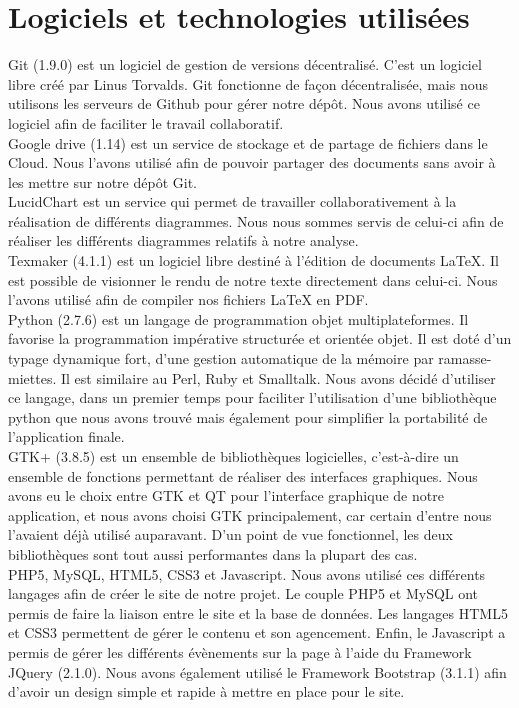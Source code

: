 ﻿\documentclass[16pts]{report}
\begin{document}
\section{Logiciels et technologies utilisées}
\label{sec:Logiciels et technologies utilisés}

Git (1.9.0) est un logiciel de gestion de versions décentralisé.
C'est un logiciel libre créé par Linus Torvalds.
Git fonctionne de façon décentralisée, mais nous utilisons les serveurs de 
Github pour gérer notre dépôt.
Nous avons utilisé ce logiciel afin de faciliter le travail collaboratif.
\\
Google drive (1.14) est un service de stockage et de partage de fichiers 
dans le Cloud. Nous l'avons utilisé afin de pouvoir partager des documents 
sans avoir à les mettre sur notre dépôt Git. 
\\
LucidChart est un service qui permet de travailler collaborativement à la 
réalisation de différents diagrammes. Nous nous sommes servis de celui-ci 
afin de réaliser les différents diagrammes relatifs à notre analyse.
\\
Texmaker (4.1.1) est un logiciel libre destiné à l'édition de documents 
LaTeX. Il est possible de visionner le rendu de notre texte directement dans 
celui-ci. Nous l'avons utilisé afin de compiler nos fichiers LaTeX en PDF.
\\
Python (2.7.6) est un langage de programmation objet multiplateformes. 
Il favorise la programmation impérative structurée et orientée objet. Il 
est doté d'un typage dynamique fort, d'une gestion automatique de la 
mémoire par ramasse-miettes. Il est similaire au Perl, Ruby et Smalltalk. 
Nous avons décidé d'utiliser ce langage, dans un premier temps pour 
faciliter l'utilisation d'une bibliothèque python que nous avons trouvé 
mais également pour simplifier la portabilité de l'application finale.
\\
GTK+ (3.8.5) est un ensemble de bibliothèques logicielles, c'est-à-dire 
un ensemble de fonctions permettant de réaliser des interfaces graphiques. 
Nous avons eu le choix entre GTK et QT pour l'interface graphique de notre 
application, et nous avons choisi GTK principalement, car certain 
d'entre nous l'avaient déjà utilisé auparavant. D'un point de vue 
fonctionnel, les deux bibliothèques sont tout aussi performantes dans 
la plupart des cas.
\\
PHP5, MySQL, HTML5, CSS3 et Javascript. Nous avons utilisé ces différents 
langages afin de créer le site de notre projet. Le couple PHP5 et MySQL 
ont permis de faire la liaison entre le site et la base de données. Les 
langages HTML5 et CSS3 permettent de gérer le contenu et son agencement. 
Enfin, le Javascript a permis de gérer les différents évènements sur la 
page à l'aide du Framework JQuery (2.1.0). Nous avons également utilisé 
le Framework Bootstrap (3.1.1) afin d'avoir un design simple et rapide à 
mettre en place pour le site.
\end{document}
